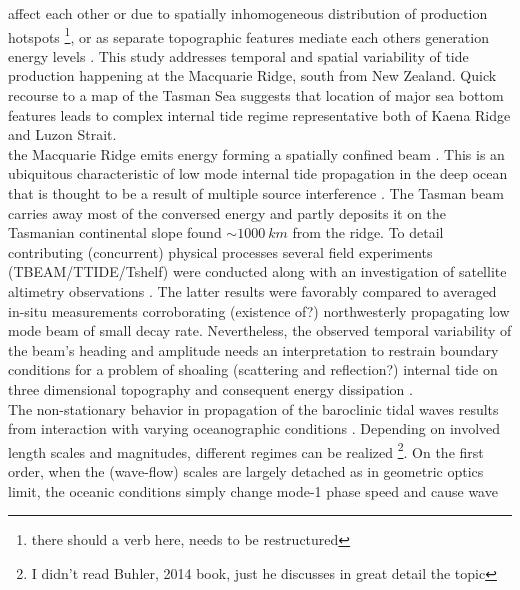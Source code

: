 \documentclass[12pt]{article}
\begin{document}
affect each other \citep{nash2004internal, zilberman2011incoherent, echeverri2010internal} or due 
to spatially inhomogeneous distribution of production hotspots \citep{osborne2011spatial, 
ponte2013coastal}\footnote{there should a verb here, needs to be restructured}, or as separate 
topographic features mediate each others generation energy levels \citep{xing1998three, 
buijsman2012modeling, buijsman2014three}. This study addresses temporal and spatial variability of 
tide production happening at the Macquarie Ridge, south from New Zealand. Quick recourse to a map 
of 
the 
Tasman Sea  suggests that location of major sea bottom features leads to 
complex internal tide regime representative both of Kaena Ridge and Luzon Strait.\\
the Macquarie Ridge emits energy forming a spatially confined beam \citep{simmons2004internal, 
zhao2016global}. This is an ubiquitous characteristic of low mode internal tide propagation in the 
deep ocean that is thought to be a result of multiple source interference 
\citep{rainville2010interference}. The Tasman beam carries away most of the 
conversed energy and partly deposits it on the Tasmanian continental slope found $\sim 1000~km$ 
from 
the ridge. To detail contributing (concurrent) physical processes several field experiments 
(TBEAM/TTIDE/Tshelf) were conducted \citep{pinkel2015breaking} along with an investigation of 
satellite altimetry observations \citep{zhao2018satellite}. The latter results were favorably 
compared to averaged in-situ measurements \citep{waterhouse2018observations} corroborating 
(existence of?) northwesterly propagating low mode beam of small decay rate. Nevertheless, the 
observed temporal variability of the beam's heading and amplitude needs an interpretation to 
restrain boundary conditions for a problem of shoaling (scattering and reflection?) internal tide 
on three dimensional topography and consequent energy dissipation \citep{klymak2016reflection}.\\
The non-stationary behavior in propagation of the baroclinic tidal waves results from interaction 
with varying oceanographic conditions \citep[e.g.,][]{mooers1975several}. Depending on involved 
length scales and magnitudes, different regimes can be realized \citep{buhler2014waves}\footnote{I 
didn't read Buhler, 2014 book, just he discusses 
in great detail the topic}. On the first order, when the (wave-flow) scales are largely detached as 
in  
geometric optics limit, the oceanic conditions simply change mode-1 phase speed and cause wave 
\end{document}
